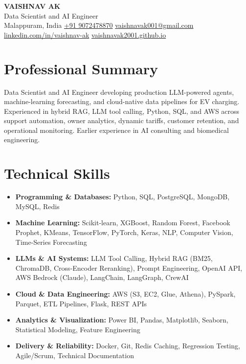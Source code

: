 \documentclass[11pt,letterpaper]{article}
\newcommand{\ChargeMODTitle}{Data Scientist and AI Engineer}
\begin{document}
\fontsize{11}{13.2}\selectfont

\begin{center}
    {\fontsize{27}{29}\selectfont\textbf{VAISHNAV AK}}\\[3pt]
    {\fontsize{12}{14}\selectfont\ChargeMODTitle}\\[4pt]
    {\small Malappuram, India\enspace\textbar\enspace
    \href{tel:+919072478870}{+91 9072478870}\enspace\textbar\enspace
    \href{mailto:vaishnavak001@gmail.com}{vaishnavak001@gmail.com}}\\[2pt]
    {\small\href{https://www.linkedin.com/in/vaishnav-ak}{linkedin.com/in/vaishnav-ak}\enspace\textbar\enspace
    \href{https://vaishnavak2001.github.io}{vaishnavak2001.github.io}}
\end{center}
\vspace{-4pt}

\section{Professional Summary}
Data Scientist and AI Engineer developing production LLM-powered agents, machine-learning forecasting, and cloud-native data pipelines for EV charging. Experienced in hybrid RAG, LLM tool calling, Python, SQL, and AWS across support automation, owner analytics, dynamic tariffs, customer retention, and operational monitoring. Earlier experience in AI consulting and biomedical engineering.

\section{Technical Skills}
\begin{itemize}[itemsep=1pt]
    \item \textbf{Programming \& Databases:} Python, SQL, PostgreSQL, MongoDB, MySQL, Redis
    \item \textbf{Machine Learning:} Scikit-learn, XGBoost, Random Forest, Facebook Prophet, KMeans, TensorFlow, PyTorch, Keras, NLP, Computer Vision, Time-Series Forecasting
    \item \textbf{LLMs \& AI Systems:} LLM Tool Calling, Hybrid RAG (BM25, ChromaDB, Cross-Encoder Reranking), Prompt Engineering, OpenAI API, AWS Bedrock (Claude), LangChain, LangGraph, CrewAI
    \item \textbf{Cloud \& Data Engineering:} AWS (S3, EC2, Glue, Athena), PySpark, Parquet, ETL Pipelines, Flask, REST APIs
    \item \textbf{Analytics \& Visualization:} Power BI, Pandas, Matplotlib, Seaborn, Statistical Modeling, Feature Engineering
    \item \textbf{Delivery \& Reliability:} Docker, Git, Redis Caching, Regression Testing, Agile/Scrum, Technical Documentation
\end{itemize}
\end{document}
